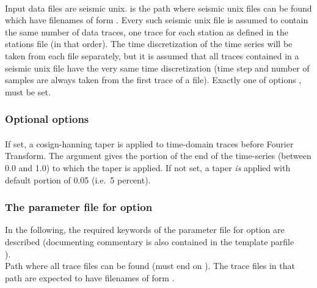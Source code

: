 \paragraph{}
Input data files are seismic unix.  is the path where seismic unix files can be found which 
have filenames of form . Every such seismic unix file is assumed to contain the same 
number of data traces, one trace for each station as defined in the \ASKI{} stations file (in that order).
The time discretization of the time series will be taken from each file separately, but it is assumed that
all traces contained in a seismic unix file have the very same time discretization (time step and number of samples
are always taken from the first trace of a file).
Exactly one of options ,  must be set.
\subsubsection{Optional options}
\paragraph{}
If set, a cosign-hanning taper is applied to time-domain traces before Fourier Transform. The argument 
 gives the portion of the end of the time-series (between 0.0 and 1.0) to which the
taper is applied. If not set, a taper \emph{is} applied with default portion of 0.05 (i.e.\ 5 percent).
\subsubsection{The parameter file for option }
In the following, the required keywords of the parameter file for option  are described 
(documenting commentary is also contained in the template parfile\\
).
\textbf{}\\
Path where all  trace files can be found (must end on \lcode{/}).
The trace files in that path are expected to have filenames of form  .

